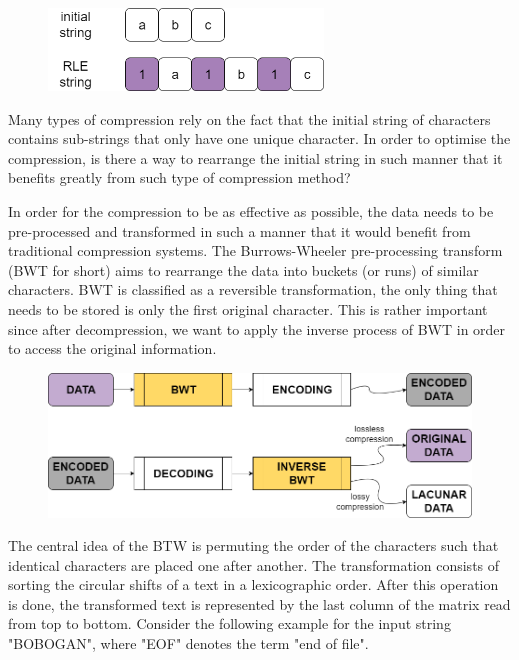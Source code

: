 \documentclass[letterpaper]{article}
\begin{document}
\begin{figure} [h!]
\centering
\includegraphics[width=0.65\textwidth]{pngOfDiagrams/compression3.png}
\end{figure}

Many types of compression rely on the fact that the initial string of characters contains sub-strings that only have one unique character. In order to optimise the compression, is there a way to rearrange the initial string in such manner that it benefits greatly from such type of compression method?

In order for the compression to be as effective as possible, the data needs to be pre-processed and transformed in such a manner that it would benefit from traditional compression systems. The Burrows-Wheeler pre-processing transform (BWT for short) aims to rearrange the data into buckets (or runs) of similar characters. BWT is classified as a reversible transformation, the only thing that needs to be stored is only the first original character. This is rather important since after decompression, we want to apply the inverse process of BWT in order to access the original information.

\newpage

\begin{figure} [h!]
\centering
\includegraphics[width=1\textwidth]{pngOfDiagrams/compression4.png}
\end{figure}

The central idea of the BTW is permuting the order of the characters such that identical characters are placed one after another. The transformation consists of sorting the circular shifts of a text in a lexicographic order. After this operation is done, the transformed text is represented by the last column of the matrix read from top to bottom. Consider the following example for the input string "BOBOGAN", where "EOF" denotes the term "end of file".
\end{document}
